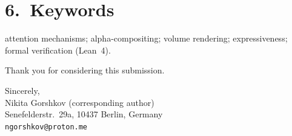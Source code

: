 \documentclass[11pt]{article}
\begin{document}
\section*{6.~Keywords}
attention mechanisms; alpha-compositing; volume rendering; expressiveness; formal
verification (Lean~4).

\bigskip
\noindent Thank you for considering this submission.

\bigskip
\noindent Sincerely,\\[0.5em]
Nikita Gorshkov (corresponding author)\\
Senefelderstr.\ 29a, 10437 Berlin, Germany\\
\texttt{ngorshkov@proton.me}
\end{document}
